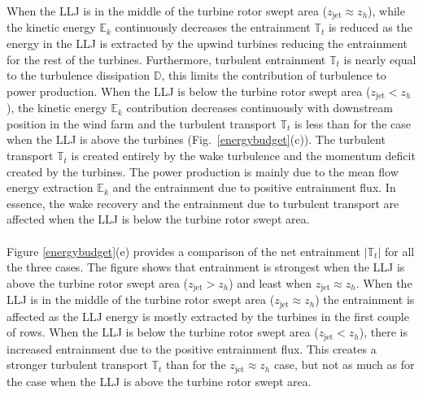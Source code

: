 \documentclass[%
 aip,
 amsmath,amssymb,
reprint,
twocolumn,%
author-numerical,%
]{revtex4-1}
\begin{document}
{{When the LLJ is in the middle of the turbine rotor swept area ($z_\text{jet} \approx z_h$), while the kinetic energy $\mathbb{E}_k$ continuously decreases the entrainment $\mathbb{T}_t$ is reduced as the energy in the LLJ is extracted by the upwind turbines reducing the entrainment for the rest of the turbines. Furthermore, turbulent entrainment $\mathbb{T}_t$ is nearly equal to the turbulence dissipation $\mathbb{D}$, this limits the contribution of turbulence to power production.
{\color{black} When the LLJ is below the turbine rotor swept area ($z_\text{jet} < z_h$), the kinetic energy $\mathbb{E}_k$ contribution decreases continuously with downstream position in the wind farm and the turbulent transport $\mathbb{T}_t$ is less than for the case when the LLJ is above the turbines (Fig.\ \ref{energybudget}(c)).} The turbulent transport $\mathbb{T}_t$ is created entirely by the wake turbulence and the momentum deficit created by the turbines. The power production is mainly due to the mean flow energy extraction $\mathbb{E}_k$ and the entrainment due to positive entrainment flux. {\color{black}In essence, the wake recovery and the entrainment due to turbulent transport are affected when the LLJ is below the turbine rotor swept area.}\\
\\
\indent Figure \ref{energybudget}(e) provides a comparison of the net entrainment $|\mathbb{T}_t|$ for all the three cases. {\color{black} The figure shows that entrainment is strongest when the LLJ is above the turbine rotor swept area ($z_\text{jet} > z_h$) and least when $z_\text{jet} \approx z_h$}. {\color{black} When the LLJ is in the middle of the turbine rotor swept area ($z_\text{jet} \approx z_h$) the entrainment is affected as the LLJ energy is mostly extracted by the turbines in the first couple of rows. When the LLJ is below the turbine rotor swept area ($z_\text{jet} < z_h$), there is increased entrainment due to the positive entrainment flux. This creates a stronger turbulent transport $\mathbb{T}_t$ than for the $z_\text{jet} \approx z_h$ case, but not as much as for the case when the LLJ is above the turbine rotor swept area.}

}}
\end{document}
